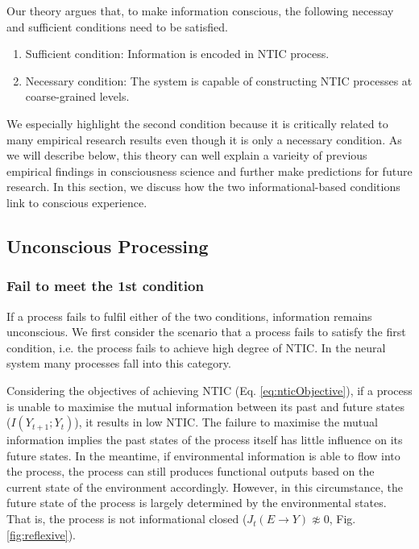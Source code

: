 \documentclass[utf8]{article}
\begin{document}
		Our theory argues that, to make information conscious, the following necessay and sufficient conditions need to be satisfied.
		
		\begin{enumerate}
		    \item Sufficient condition: Information is encoded in NTIC process. 
		    \item Necessary condition: The system is capable of constructing NTIC processes at coarse-grained levels. 
		\end{enumerate}		
		
        We especially highlight the second condition because it is critically related to many empirical research results even though it is only a necessary condition. As we will describe below, this theory can well explain a varieity of previous empirical findings in consciousness science and further make predictions for future research. In this section, we discuss how the two informational-based conditions link to conscious experience. 
		
		
		
        \subsection{Unconscious Processing}
        
        \subsubsection*{Fail to meet the 1\lowercase{st} condition}
            If a process fails to fulfil either of the two conditions, information remains unconscious. We first consider the scenario that a process fails to satisfy the first condition, i.e. the process fails to achieve high degree of NTIC. In the neural system many processes fall into this category. 
        	
        	Considering the objectives of achieving NTIC (Eq. \ref{eq:nticObjective}), if a process is unable to maximise the mutual information between its past and future states ($I(Y_{t+1};Y_{t})$), it results in low NTIC. The failure to maximise the mutual information implies the past states of the process itself has little influence on its future states. In the meantime, if environmental information is able to flow into the process, the process can still produces functional outputs based on the current state of the environment accordingly. However, in this circumstance, the future state of the process is largely determined by the environmental states. That is, the process is not informational closed (${J_{t}(E \rightarrow Y )} \not\approx 0$, Fig.\ref{fig:reflexive}). 
            	
\end{document}
